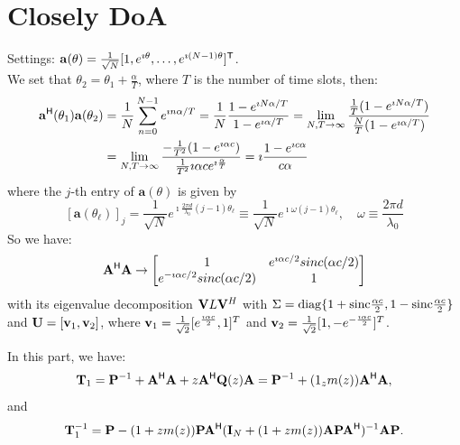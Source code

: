 \documentclass[11pt,a4paper]{article}
\begin{document}
\section{Closely DoA}
Settings: $\mathbf{a}(\theta)=\frac{1}{\sqrt{N}}[1,e^{\imath\theta},\dots,e^{\imath(N-1)\theta}]^{\sf T}$.
\\

We set that $\theta_2 = \theta_1+\frac{\alpha}{T}$, where $T$ is the number of time slots, then:
\begin{align*}
    \mathbf{a}^{\sf H}(\theta_1) \mathbf{a}(\theta_2) &= \frac{1}{N} \sum_{n=0}^{N-1} e^{\imath n \alpha /T} = \frac{1}{N} \frac{1-e^{\imath N \alpha/T}}{1-e^{\imath \alpha/T}} = \lim_{N,T\to \infty} \frac{\frac{1}{T}(1-e^{\imath N \alpha/T})}{\frac{N}{T}(1-e^{\imath \alpha/T})} \\
    &= \lim_{N,T\to \infty} \frac{-\frac{1}{T^2}(1-e^{\imath \alpha c})}{\frac{1}{T^2}\imath \alpha c e^{\imath \frac{\alpha}{T}}} = \imath \frac{1-e^{\imath c \alpha}}{c \alpha}
\end{align*}
where the $j$-th entry of $\mathbf{a}(\theta)$ is given by
\begin{equation}\label{eq:def_ULA}
	[\mathbf{a}(\theta_\ell)]_j = \frac1{\sqrt N} e^{\imath \frac{2\pi d}{\lambda_0} (j-1) \theta_\ell} \equiv \frac1{\sqrt N} e^{\imath \omega (j-1) \theta_\ell}, \quad \omega \equiv \frac{2 \pi d }{\lambda_0}
\end{equation}
So we have:
\begin{align*}
    {\mathbf{A}}^{\sf H} {\mathbf{A}} \to \begin{bmatrix}
        1 & e^{\imath \alpha c/2} sinc(\alpha c/2) \\
        e^{-\imath \alpha c/2} sinc(\alpha c/2) & 1
    \end{bmatrix}    
\end{align*}
with its eigenvalue decomposition $\mathbf{V} L \mathbf{V}^H$ with $\Sigma = \operatorname{diag}\{1+\text{sinc}\frac{\alpha c}{2},1-\text{sinc}\frac{\alpha c}{2}\}$ and ${\mathbf{U}}=[\mathbf{v}_1,\mathbf{v}_2]$, where $\mathbf{v}_1 = \frac{1}{\sqrt{2}}[e^{\frac{\imath \alpha c}{2}}, 1]^T$ and $\mathbf{v}_2 = \frac{1}{\sqrt{2}}[1, -e^{-\frac{\imath \alpha c}{2}}]^T$. 

In this part, we have:
\begin{equation}
	\mathbf{T}_1 = {\mathbf{P}}^{-1} + {\mathbf{A}}^{\sf H} {\mathbf{A}}+z{\mathbf{A}}^{\sf H} {\mathbf{Q}}(z){\mathbf{A}} = {\mathbf{P}}^{-1}+(1_zm(z)){\mathbf{A}}^{\sf H} {\mathbf{A}},
\end{equation}
and
\begin{align*}
    \mathbf{T}^{-1}_1 = {\mathbf{P}}-(1+zm(z)){\mathbf{P}}{\mathbf{A}}^{\sf H} (\mathbf{I}_N +(1+zm(z)){\mathbf{A}}{\mathbf{P}}{\mathbf{A}}^{\sf H})^{-1}{\mathbf{A}}{\mathbf{P}}.
\end{align*}
\end{document}
